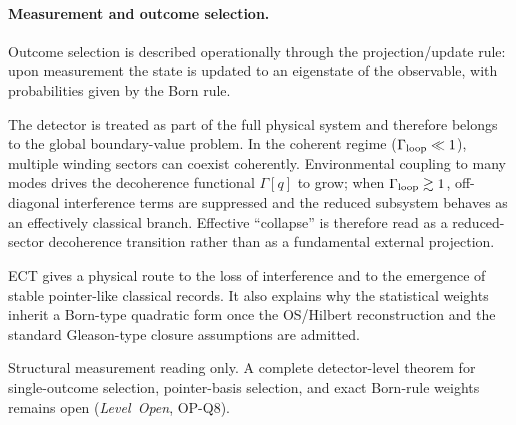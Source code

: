 \documentclass[11pt,a4paper]{article}
\begin{document}
\paragraph{Measurement and outcome selection.}
\begin{description}[leftmargin=2.8cm, style=nextline]
\item[Standard QM.] Outcome selection is described operationally through the projection/update rule: upon measurement the state is updated to an eigenstate of the observable, with probabilities given by the Born rule.
\item[ECT (physical picture).] The detector is treated as part of the full physical system and therefore belongs to the global boundary-value problem. In the coherent regime ($\Gamma_{\rm loop}\ll 1$), multiple winding sectors can coexist coherently. Environmental coupling to many modes drives the decoherence functional $\Gamma[q]$ to grow; when $\Gamma_{\rm loop}\gtrsim 1$, off-diagonal interference terms are suppressed and the reduced subsystem behaves as an effectively classical branch. Effective ``collapse'' is therefore read as a reduced-sector decoherence transition rather than as a fundamental external projection.
\item[What this explains.] ECT gives a physical route to the loss of interference and to the emergence of stable pointer-like classical records. It also explains why the statistical weights inherit a Born-type quadratic form once the OS/Hilbert reconstruction and the standard Gleason-type closure assumptions are admitted.
\item[Status.] Structural measurement reading only. A complete detector-level theorem for single-outcome selection, pointer-basis selection, and exact Born-rule weights remains open (\emph{Level~Open}, OP-Q8).
\end{description}
\end{document}
